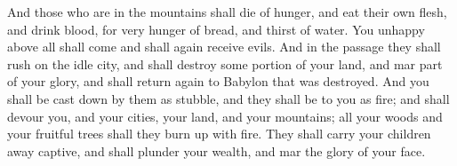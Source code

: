 {And those who are in the mountains shall die of hunger, and eat their own flesh, and drink
{} blood, for very hunger of bread, and thirst of water.
You unhappy above all shall come and shall again receive evils.
And in the passage they shall rush on the
 idle city, and shall destroy some portion of your land, and mar part of your glory, and shall return again to Babylon that was destroyed.
And you shall be cast down by them as stubble, and they shall be to you as fire;
and shall devour you, and your cities, your land, and your mountains; all your woods and your fruitful trees shall they burn up with fire.
They shall carry your children away captive, and shall plunder your wealth, and mar the glory of your face.

}
